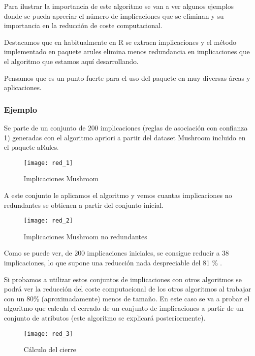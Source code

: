 Para ilustrar la importancia de este algoritmo se van a ver algunos ejemplos donde se pueda apreciar el n\'umero de implicaciones que se eliminan y su importancia en la reducci\'on de coste computacional.

Destacamos que en habitualmente en R se extraen implicaciones y el m\'etodo implementado en paquete arules elimina menos redundancia en implicaciones que el algoritmo que estamos aqu\'i desarrollando. 

Pensamos que es un punto fuerte para el uso del paquete en muy diversas \'areas y aplicaciones. 

\subsubsection{Ejemplo}

Se parte de un conjunto de 200 implicaciones (reglas de asociaci\'on con confianza 1) generadas con el algoritmo apriori a partir del dataset Mushroom incluido en el paquete aRules.

\begin{figure}[H]
    \centering
    \texttt{[image: red\_1]}
    \caption{Implicaciones Mushroom}
    \label{fig:red_1}
\end{figure} 
\newpage
A este conjunto le aplicamos el algoritmo y vemos cuantas implicaciones no redundantes se obtienen a partir del conjunto inicial.

\begin{figure}[H]
    \centering
    \texttt{[image: red\_2]}
    \caption{Implicaciones Mushroom no redundantes}
    \label{fig:red_2}
\end{figure} 

Como se puede ver, de 200 implicaciones iniciales, se consigue reducir a 38 implicaciones, lo que supone una reducci\'on nada despreciable del 81 \% .

Si probamos a utilizar estos conjuntos de implicaciones con otros algoritmos se podr\'a ver la reducci\'on del coste computacional de los otros algoritmos al trabajar con un 80\% (aproximadamente) menos de tama\~no. En este caso se va a probar el algoritmo que calcula el cerrado de un conjunto de implicaciones a partir de un conjunto de atributos (este algoritmo se explicar\'a posteriormente).

\begin{figure}[H]
    \centering
    \texttt{[image: red\_3]}
    \caption{C\'alculo del cierre}
    \label{fig:red_3}
\end{figure}

